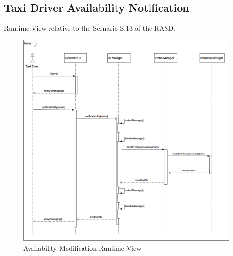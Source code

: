 \documentclass[../../../../../../dd.tex]{subfiles}
\begin{document}
	\subsection{Taxi Driver Availability Notification}
		Runtime View relative to the Scenario S.13 of the RASD.
		\begin{figure}[H]
				\centering
				\includegraphics[width=\textwidth, scale=0.5]{../images/SequenceDiagrams/AvailMod.png}
			\caption{Availability Modification Runtime View}\label{fig:AvailabilityModify}
		\end{figure}
\end{document}
